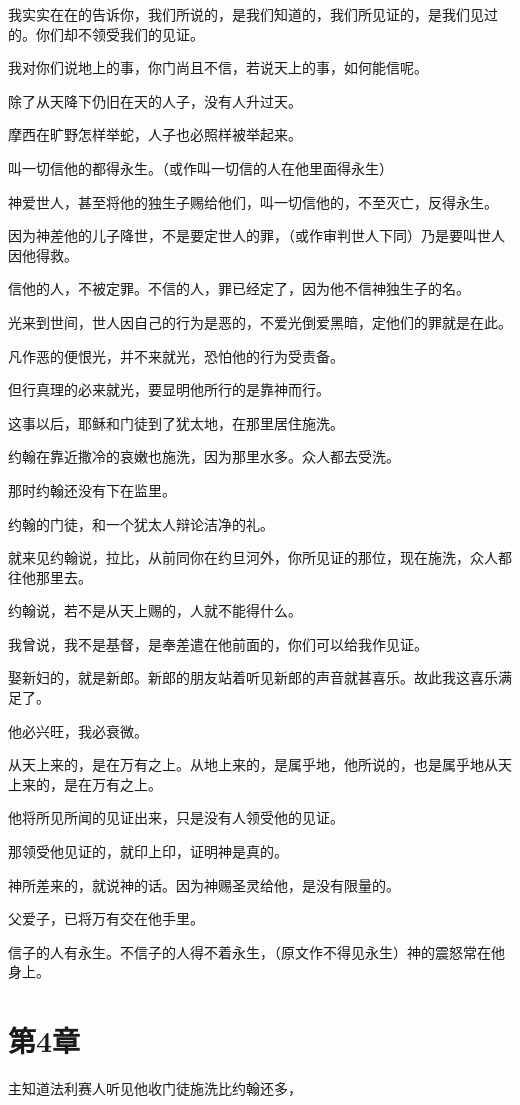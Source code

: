 \documentclass[12pt,oneside]{book}
\begin{document}
我实实在在的告诉你，我们所说的，是我们知道的，我们所见证的，是我们见过的。你们却不领受我们的见证。

我对你们说地上的事，你门尚且不信，若说天上的事，如何能信呢。

除了从天降下仍旧在天的人子，没有人升过天。

摩西在旷野怎样举蛇，人子也必照样被举起来。

叫一切信他的都得永生。（或作叫一切信的人在他里面得永生）

神爱世人，甚至将他的独生子赐给他们，叫一切信他的，不至灭亡，反得永生。

因为神差他的儿子降世，不是要定世人的罪，（或作审判世人下同）乃是要叫世人因他得救。

信他的人，不被定罪。不信的人，罪已经定了，因为他不信神独生子的名。

光来到世间，世人因自己的行为是恶的，不爱光倒爱黑暗，定他们的罪就是在此。

凡作恶的便恨光，并不来就光，恐怕他的行为受责备。

但行真理的必来就光，要显明他所行的是靠神而行。

这事以后，耶稣和门徒到了犹太地，在那里居住施洗。

约翰在靠近撒冷的哀嫩也施洗，因为那里水多。众人都去受洗。

那时约翰还没有下在监里。

约翰的门徒，和一个犹太人辩论洁净的礼。

就来见约翰说，拉比，从前同你在约旦河外，你所见证的那位，现在施洗，众人都往他那里去。

约翰说，若不是从天上赐的，人就不能得什么。

我曾说，我不是基督，是奉差遣在他前面的，你们可以给我作见证。

娶新妇的，就是新郎。新郎的朋友站着听见新郎的声音就甚喜乐。故此我这喜乐满足了。

他必兴旺，我必衰微。

从天上来的，是在万有之上。从地上来的，是属乎地，他所说的，也是属乎地从天上来的，是在万有之上。

他将所见所闻的见证出来，只是没有人领受他的见证。

那领受他见证的，就印上印，证明神是真的。

神所差来的，就说神的话。因为神赐圣灵给他，是没有限量的。

父爱子，已将万有交在他手里。

信子的人有永生。不信子的人得不着永生，（原文作不得见永生）神的震怒常在他身上。

\chapter{第4章}
主知道法利赛人听见他收门徒施洗比约翰还多，
\end{document}
